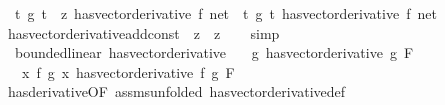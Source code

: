 \begin{isabellebody}
\ \ {\isachardoublequoteopen}{\isacharparenleft}{\kern0pt}{\isacharparenleft}{\kern0pt}{\isasymlambda}t{\isachardot}{\kern0pt}\ g\ t\ {\isacharminus}{\kern0pt}\ z{\isacharparenright}{\kern0pt}\ has{\isacharunderscore}{\kern0pt}vector{\isacharunderscore}{\kern0pt}derivative\ f{\isacharprime}{\kern0pt}{\isacharparenright}{\kern0pt}\ net\ {\isacharequal}{\kern0pt}\ {\isacharparenleft}{\kern0pt}{\isacharparenleft}{\kern0pt}{\isasymlambda}t{\isachardot}{\kern0pt}\ g\ t{\isacharparenright}{\kern0pt}\ has{\isacharunderscore}{\kern0pt}vector{\isacharunderscore}{\kern0pt}derivative\ f{\isacharprime}{\kern0pt}{\isacharparenright}{\kern0pt}\ net{\isachardoublequoteclose}\isanewline
%
\isadelimproof
\ \ %
\endisadelimproof
%
\isatagproof
{}\isamarkupfalse%
\ has{\isacharunderscore}{\kern0pt}vector{\isacharunderscore}{\kern0pt}derivative{\isacharunderscore}{\kern0pt}add{\isacharunderscore}{\kern0pt}const\ {\isacharbrackleft}{\kern0pt}\ z\ {\isacharequal}{\kern0pt}\ {\isachardoublequoteopen}{\isacharminus}{\kern0pt}z{\isachardoublequoteclose}{\isacharbrackright}{\kern0pt}\isanewline
\ \ \isamarkupfalse%
\ simp%
\endisatagproof
{\isafoldproof}%
%
\isadelimproof
\isanewline
%
\endisadelimproof
\isanewline
{}\isamarkupfalse%
\ {\isacharparenleft}{\kern0pt}\ bounded{\isacharunderscore}{\kern0pt}linear{\isacharparenright}{\kern0pt}\ has{\isacharunderscore}{\kern0pt}vector{\isacharunderscore}{\kern0pt}derivative{\isacharcolon}{\kern0pt}\isanewline
\ \ \ {\isachardoublequoteopen}{\isacharparenleft}{\kern0pt}g\ has{\isacharunderscore}{\kern0pt}vector{\isacharunderscore}{\kern0pt}derivative\ g{\isacharprime}{\kern0pt}{\isacharparenright}{\kern0pt}\ F{\isachardoublequoteclose}\isanewline
\ \ \ {\isachardoublequoteopen}{\isacharparenleft}{\kern0pt}{\isacharparenleft}{\kern0pt}{\isasymlambda}x{\isachardot}{\kern0pt}\ f\ {\isacharparenleft}{\kern0pt}g\ x{\isacharparenright}{\kern0pt}{\isacharparenright}{\kern0pt}\ has{\isacharunderscore}{\kern0pt}vector{\isacharunderscore}{\kern0pt}derivative\ f\ g{\isacharprime}{\kern0pt}{\isacharparenright}{\kern0pt}\ F{\isachardoublequoteclose}\isanewline
%
\isadelimproof
\ \ %
\endisadelimproof
%
\isatagproof
{}\isamarkupfalse%
\ has{\isacharunderscore}{\kern0pt}derivative{\isacharbrackleft}{\kern0pt}OF\ assms{\isacharbrackleft}{\kern0pt}unfolded\ has{\isacharunderscore}{\kern0pt}vector{\isacharunderscore}{\kern0pt}derivative{\isacharunderscore}{\kern0pt}def{\isacharbrackright}{\kern0pt}{\isacharbrackright}{\kern0pt}\isanewline

\end{isabellebody}
